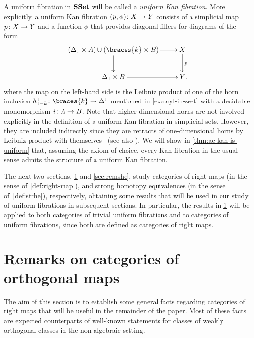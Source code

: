 \documentclass[reqno,10pt,a4paper,oneside]{amsart}
\begin{document}
\begin{example}
A uniform fibration in $\mathbf{SSet}$ will be called a \emph{uniform Kan fibration}.
More explicitly, a uniform Kan fibration $(p, \phi) \colon X \to Y$ consists of a simplicial map $p \colon X \to Y$ and a function $\phi$ that provides diagonal fillers for diagrams of the form
\[
\xymatrix{
  (\Delta_1 \times A) \cup (\braces{k} \times B)
  \ar[r]
  \ar[d]
&
  X
  \ar[d]^{p}
\\
  \Delta_1 \times B
  \ar[r]
&
  Y
\rlap{.}}
\]
where the map on the left-hand side is the Leibniz product of one of the horn inclusion $h_{1-k}^1 \co \braces{k} \to \Delta^1$ mentioned in \cref{exa:cyl-in-sset} with a decidable monomorphism $i \colon A \to B$.
Note that higher-dimensional horns are not involved explicitly in the definition of a uniform Kan fibration in simplicial sets.
However, they are included indirectly since they are retracts of one-dimensional horns by Leibniz product with themselves~\cite{joyal-quaderns} (see also \cite[Proposition 2.1.2.6]{lurie:htt}).
We will show in \cref{thm:ac-kan-is-uniform} that, assuming the axiom of choice, every Kan fibration in the usual sense admits the structure of a uniform Kan fibration.
\end{example}



\begin{example}
\end{example}


The next two sections, \cref{sec:ortf} and \cref{sec:remshe}, study categories of right maps (in the sense of~\cref{def:right-map}), and strong homotopy equivalences (in the sense of~\cref{def:strhe}), respectively, obtaining some results that will be used in our study of uniform fibrations in subsequent sections.
In particular, the results in \cref{sec:ortf} will be applied to both categories of trivial uniform fibrations and to categories of uniform fibrations, since both are defined as categories of right maps.



\section{Remarks on categories of orthogonal maps}
\label{sec:ortf}



The aim of this section is to establish some general facts regarding categories of right maps that will be useful in the remainder of the paper.
Most of these facts are expected counterparts of well-known statements for classes of weakly orthogonal classes in the non-algebraic setting.
\end{document}

